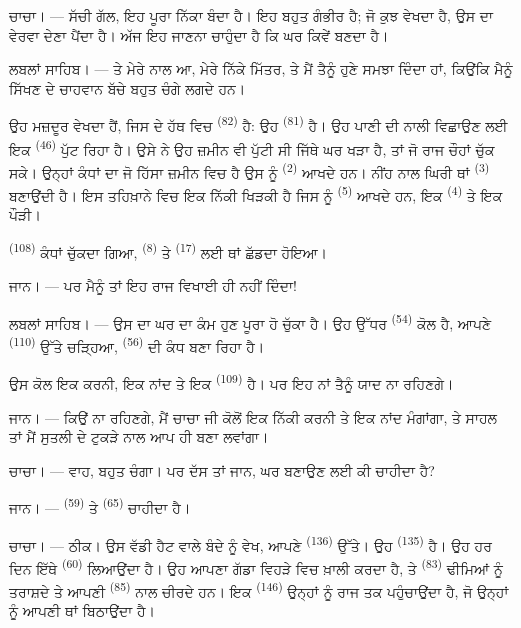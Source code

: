 \textsc{ਚਾਚਾ}। --- ਸੱਚੀ ਗੱਲ, ਇਹ ਪੂਰਾ ਨਿੱਕਾ ਬੰਦਾ ਹੈ। ਇਹ ਬਹੁਤ ਗੰਭੀਰ ਹੈ; ਜੋ ਕੁਝ
ਵੇਖਦਾ ਹੈ, ਉਸ ਦਾ ਵੇਰਵਾ ਦੇਣਾ ਪੈਂਦਾ ਹੈ। ਅੱਜ ਇਹ ਜਾਣਨਾ ਚਾਹੁੰਦਾ ਹੈ ਕਿ ਘਰ ਕਿਵੇਂ ਬਣਦਾ
ਹੈ।

\VUsaut{3.0mm}

\textsc{ਲਬਲਾਂ ਸਾਹਿਬ}। --- ਤੇ ਮੇਰੇ ਨਾਲ ਆ, ਮੇਰੇ ਨਿੱਕੇ ਮਿੱਤਰ, ਤੇ ਮੈਂ ਤੈਨੂੰ ਹੁਣੇ
ਸਮਝਾ ਦਿੰਦਾ ਹਾਂ, ਕਿਉਂਕਿ ਮੈਨੂੰ ਸਿੱਖਣ ਦੇ ਚਾਹਵਾਨ ਬੱਚੇ ਬਹੁਤ ਚੰਗੇ ਲਗਦੇ ਹਨ।

ਉਹ ਮਜ਼ਦੂਰ ਵੇਖਦਾ ਹੈਂ, ਜਿਸ ਦੇ ਹੱਥ ਵਿਚ  \textsuperscript{(82)} ਹੈ: ਉਹ
 \textsuperscript{(81)} ਹੈ। ਉਹ ਪਾਣੀ ਦੀ ਨਾਲੀ ਵਿਛਾਉਣ ਲਈ ਇਕ
 \textsuperscript{(46)} ਪੁੱਟ ਰਿਹਾ ਹੈ। ਉਸੇ ਨੇ ਉਹ ਜ਼ਮੀਨ ਵੀ ਪੁੱਟੀ ਸੀ
ਜਿੱਥੇ ਘਰ ਖੜਾ ਹੈ, ਤਾਂ ਜੋ ਰਾਜ ਚੌਹਾਂ  ਚੁੱਕ ਸਕੇ। ਉਨ੍ਹਾਂ ਕੰਧਾਂ ਦਾ ਜੋ
ਹਿੱਸਾ ਜ਼ਮੀਨ ਵਿਚ ਹੈ ਉਸ ਨੂੰ  \textsuperscript{(2)} ਆਖਦੇ ਹਨ। ਨੀਂਹ ਨਾਲ
ਘਿਰੀ ਥਾਂ  \textsuperscript{(3)} ਬਣਾਉਂਦੀ ਹੈ। ਇਸ ਤਹਿਖ਼ਾਨੇ ਵਿਚ ਇਕ
ਨਿੱਕੀ ਖਿੜਕੀ ਹੈ ਜਿਸ ਨੂੰ  \textsuperscript{(5)} ਆਖਦੇ ਹਨ, ਇਕ
 \textsuperscript{(4)} ਤੇ ਇਕ ਪੌੜੀ।

 \textsuperscript{(108)} ਕੰਧਾਂ ਚੁੱਕਦਾ ਗਿਆ, 
\textsuperscript{(8)} ਤੇ  \textsuperscript{(17)} ਲਈ ਥਾਂ ਛੱਡਦਾ ਹੋਇਆ।

\textsc{ਜਾਨ}। --- ਪਰ ਮੈਨੂੰ ਤਾਂ ਇਹ ਰਾਜ ਵਿਖਾਈ ਹੀ ਨਹੀਂ ਦਿੰਦਾ!

\textsc{ਲਬਲਾਂ ਸਾਹਿਬ}। --- ਉਸ ਦਾ ਘਰ ਦਾ ਕੰਮ ਹੁਣ ਪੂਰਾ ਹੋ ਚੁੱਕਾ ਹੈ। ਉਹ ਉੱਧਰ
 \textsuperscript{(54)} ਕੋਲ ਹੈ, ਆਪਣੇ 
\textsuperscript{(110)} ਉੱਤੇ ਚੜ੍ਹਿਆ,  \textsuperscript{(56)} ਦੀ ਕੰਧ
ਬਣਾ ਰਿਹਾ ਹੈ।

ਉਸ ਕੋਲ ਇਕ ਕਰਨੀ, ਇਕ ਨਾਂਦ ਤੇ ਇਕ  \textsuperscript{(109)} ਹੈ। ਪਰ ਇਹ ਨਾਂ
ਤੈਨੂੰ ਯਾਦ ਨਾ ਰਹਿਣਗੇ।

\textsc{ਜਾਨ}। --- ਕਿਉਂ ਨਾ ਰਹਿਣਗੇ, ਮੈਂ ਚਾਚਾ ਜੀ ਕੋਲੋਂ ਇਕ ਨਿੱਕੀ ਕਰਨੀ ਤੇ ਇਕ ਨਾਂਦ
ਮੰਗਾਂਗਾ, ਤੇ ਸਾਹਲ ਤਾਂ ਮੈਂ ਸੁਤਲੀ ਦੇ ਟੁਕੜੇ ਨਾਲ ਆਪ ਹੀ ਬਣਾ ਲਵਾਂਗਾ।

\VUsaut{3.0mm}
\VUsaut{3.0mm}

\textsc{ਚਾਚਾ}। --- ਵਾਹ, ਬਹੁਤ ਚੰਗਾ। ਪਰ ਦੱਸ ਤਾਂ ਜਾਨ, ਘਰ ਬਣਾਉਣ ਲਈ ਕੀ ਚਾਹੀਦਾ ਹੈ?

\textsc{ਜਾਨ}। ---  \textsuperscript{(59)} ਤੇ
 \textsuperscript{(65)} ਚਾਹੀਦਾ ਹੈ।

\textsc{ਚਾਚਾ}। --- ਠੀਕ। ਉਸ ਵੱਡੀ ਹੈਟ ਵਾਲੇ ਬੰਦੇ ਨੂੰ ਵੇਖ, ਆਪਣੇ 
\textsuperscript{(136)} ਉੱਤੇ। ਉਹ  \textsuperscript{(135)} ਹੈ। ਉਹ
ਹਰ ਦਿਨ ਇੱਥੇ  \textsuperscript{(60)} ਲਿਆਉਂਦਾ ਹੈ। ਉਹ ਆਪਣਾ ਗੱਡਾ
ਵਿਹੜੇ ਵਿਚ ਖ਼ਾਲੀ ਕਰਦਾ ਹੈ, ਤੇ  \textsuperscript{(83)} ਢੀਮਿਆਂ ਨੂੰ
ਤਰਾਸ਼ਦੇ ਤੇ ਆਪਣੀ  \textsuperscript{(85)} ਨਾਲ ਚੀਰਦੇ ਹਨ। ਇਕ
 \textsuperscript{(146)} ਉਨ੍ਹਾਂ ਨੂੰ ਰਾਜ ਤਕ ਪਹੁੰਚਾਉਂਦਾ ਹੈ, ਜੋ
ਉਨ੍ਹਾਂ ਨੂੰ ਆਪਣੀ ਥਾਂ ਬਿਠਾਉਂਦਾ ਹੈ।

